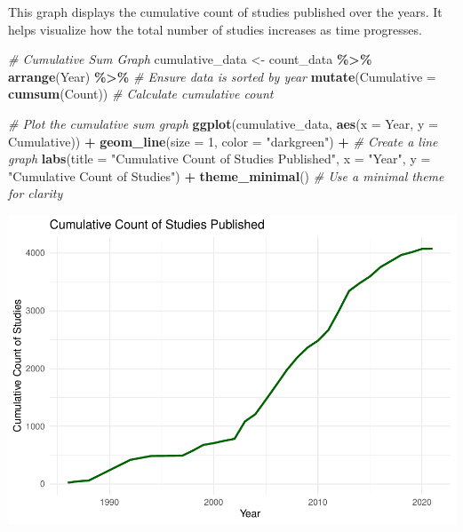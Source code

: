 \documentclass[
]{book}
\newenvironment{Shaded}{\begin{snugshade}}{\end{snugshade}}
\newcommand{\AttributeTok}[1]{\textcolor[rgb]{0.13,0.29,0.53}{#1}}
\newcommand{\CommentTok}[1]{\textcolor[rgb]{0.56,0.35,0.01}{\textit{#1}}}
\newcommand{\DecValTok}[1]{\textcolor[rgb]{0.00,0.00,0.81}{#1}}
\newcommand{\FunctionTok}[1]{\textcolor[rgb]{0.13,0.29,0.53}{\textbf{#1}}}
\newcommand{\NormalTok}[1]{#1}
\newcommand{\OtherTok}[1]{\textcolor[rgb]{0.56,0.35,0.01}{#1}}
\newcommand{\SpecialCharTok}[1]{\textcolor[rgb]{0.81,0.36,0.00}{\textbf{#1}}}
\newcommand{\StringTok}[1]{\textcolor[rgb]{0.31,0.60,0.02}{#1}}
\begin{document}
This graph displays the cumulative count of studies published over the years.
It helps visualize how the total number of studies increases as time progresses.

\begin{Shaded}
\begin{Highlighting}[]
\CommentTok{\# Cumulative Sum Graph}
\NormalTok{cumulative\_data }\OtherTok{\textless{}{-}}\NormalTok{ count\_data }\SpecialCharTok{\%\textgreater{}\%}
  \FunctionTok{arrange}\NormalTok{(Year) }\SpecialCharTok{\%\textgreater{}\%}  \CommentTok{\# Ensure data is sorted by year}
  \FunctionTok{mutate}\NormalTok{(}\AttributeTok{Cumulative =} \FunctionTok{cumsum}\NormalTok{(Count))  }\CommentTok{\# Calculate cumulative count}

\CommentTok{\# Plot the cumulative sum graph}
\FunctionTok{ggplot}\NormalTok{(cumulative\_data, }\FunctionTok{aes}\NormalTok{(}\AttributeTok{x =}\NormalTok{ Year, }\AttributeTok{y =}\NormalTok{ Cumulative)) }\SpecialCharTok{+}
  \FunctionTok{geom\_line}\NormalTok{(}\AttributeTok{size =} \DecValTok{1}\NormalTok{, }\AttributeTok{color =} \StringTok{"darkgreen"}\NormalTok{) }\SpecialCharTok{+}  \CommentTok{\# Create a line graph}
  \FunctionTok{labs}\NormalTok{(}\AttributeTok{title =} \StringTok{"Cumulative Count of Studies Published"}\NormalTok{,}
       \AttributeTok{x =} \StringTok{"Year"}\NormalTok{,}
       \AttributeTok{y =} \StringTok{"Cumulative Count of Studies"}\NormalTok{) }\SpecialCharTok{+}
  \FunctionTok{theme\_minimal}\NormalTok{()  }\CommentTok{\# Use a minimal theme for clarity}
\end{Highlighting}
\end{Shaded}

\includegraphics{_main_files/figure-latex/unnamed-chunk-6-1.pdf}
\end{document}
